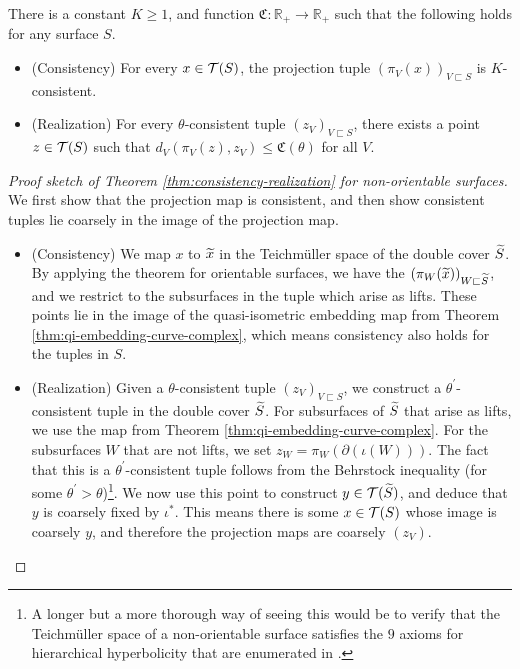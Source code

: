 \documentclass[12pt, reqno]{amsart}
\begin{document}
\begin{theorem}
  \label{thm:consistency-realization}
  There is a constant $K \geq 1$, and function $\mathfrak{C}: \mathbb{R}_+ \to \mathbb{R}_+$ such that the following holds for any surface $S$.
  \begin{itemize}
  \item (Consistency) For every $x \in \mathcal{T}(S)$, the projection tuple $(\pi_V(x))_{V \sqsubset S}$ is $K$-consistent.
  \item (Realization) For every $\theta$-consistent tuple $(z_V)_{V \sqsubset S}$, there exists a point $z \in \mathcal{T}(S)$ such that $d_V(\pi_V(z), z_V) \leq \mathfrak{C}(\theta)$ for all $V$.
  \end{itemize}
\end{theorem}
\begin{proof}[Proof sketch of Theorem \ref{thm:consistency-realization} for non-orientable surfaces]
    We first show that the projection map is consistent, and then show consistent tuples lie coarsely in the image of the projection map.
  \begin{itemize}
  \item (Consistency) We map $x$ to $\widetilde{x}$ in the Teichmüller space of the double cover $\widetilde{S}$.
    By applying the theorem for orientable surfaces, we have the $(\pi_{W}(\widetilde{x}))_{W \sqsubset \widetilde{S}}$, and we restrict to the subsurfaces in the tuple which arise as lifts.
    These points lie in the image of the quasi-isometric embedding map from Theorem \ref{thm:qi-embedding-curve-complex}, which means consistency also holds for the tuples in $S$.
  \item (Realization) Given a $\theta$-consistent tuple $(z_V)_{V \sqsubset S}$, we construct a $\theta^{\prime}$-consistent tuple in the double cover $\widetilde{S}$.
    For subsurfaces of $\widetilde{S}$ that arise as lifts, we use the map from Theorem \ref{thm:qi-embedding-curve-complex}.
    For the subsurfaces $W$ that are not lifts, we set $z_W = \pi_W(\partial(\iota(W)))$.
    The fact that this is a $\theta^{\prime}$-consistent tuple follows from the Behrstock inequality (for some $\theta^{\prime} > \theta$)\footnote{A longer but a more thorough way of seeing this would be to verify that the Teichmüller space of a non-orientable surface satisfies the $9$ axioms for hierarchical hyperbolicity that are enumerated in \textcite{behrstock2019hierarchically}.}.
    We now use this point to construct $y \in \mathcal{T}(\widetilde{S})$, and deduce that $y$ is coarsely fixed by $\iota^{\ast}$.
    This means there is some $x \in \mathcal{T}(S)$ whose image is coarsely $y$, and therefore the projection maps are coarsely $(z_V)$.
  \end{itemize}
\end{proof}

\printbibliography
\end{document}
